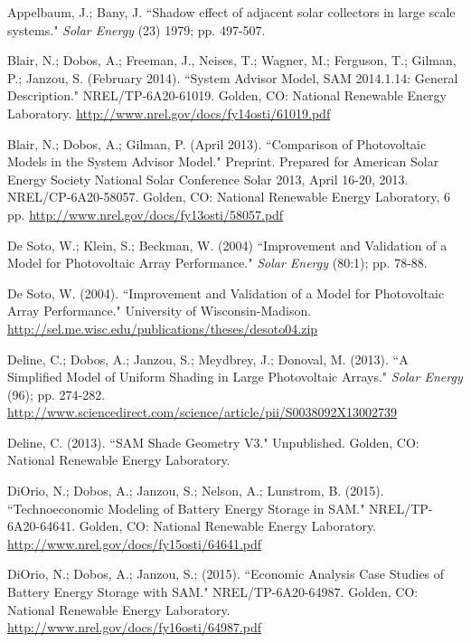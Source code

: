 \documentclass[12pt,letterpaper]{article}
\begin{document}
%
\begin{thebibliography}{99}

 Appelbaum, J.; Bany, J. ``Shadow effect of adjacent solar collectors in large scale systems." \textit{Solar Energy} (23) 1979; pp. 497-507.

 Blair, N.; Dobos, A.; Freeman, J., Neises, T.; Wagner, M.; Ferguson, T.; Gilman, P.; Janzou, S. (February 2014). ``System Advisor Model, SAM
2014.1.14: General Description." NREL/TP-6A20-61019. Golden, CO: National Renewable Energy Laboratory. \url{http://www.nrel.gov/docs/fy14osti/61019.pdf}

 Blair, N.; Dobos, A.; Gilman, P. (April 2013). ``Comparison of Photovoltaic Models in the System Advisor Model." Preprint. Prepared for American Solar Energy Society National Solar Conference Solar 2013, April 16-20, 2013. NREL/CP-6A20-58057. Golden, CO: National Renewable Energy Laboratory, 6 pp. \url{http://www.nrel.gov/docs/fy13osti/58057.pdf}

 De Soto, W.; Klein, S.; Beckman, W. (2004) ``Improvement and Validation of a Model for Photovoltaic Array Performance." \textit{Solar Energy} (80:1); pp. 78-88.

 De Soto, W. (2004). ``Improvement and Validation of a Model for Photovoltaic Array Performance." University of Wisconsin-Madison. \url{http://sel.me.wisc.edu/publications/theses/desoto04.zip}

 Deline, C.; Dobos, A.; Janzou, S.; Meydbrey, J.; Donoval, M. (2013). ``A Simplified Model of Uniform Shading in Large Photovoltaic Arrays." \textit{Solar Energy} (96); pp. 274-282. \url{http://www.sciencedirect.com/science/article/pii/S0038092X13002739}

 Deline, C. (2013). ``SAM Shade Geometry V3." Unpublished. Golden, CO: National Renewable Energy Laboratory.

 DiOrio, N.; Dobos, A.; Janzou, S.; Nelson, A.; Lunstrom, B. (2015). ``Technoeconomic Modeling of Battery Energy Storage in SAM."  NREL/TP-6A20-64641. Golden, CO: National Renewable Energy Laboratory. \url{http://www.nrel.gov/docs/fy15osti/64641.pdf}

 DiOrio, N.; Dobos, A.; Janzou, S.; (2015). ``Economic Analysis Case Studies of Battery Energy Storage with SAM."  NREL/TP-6A20-64987. Golden, CO: National Renewable Energy Laboratory. \url{http://www.nrel.gov/docs/fy16osti/64987.pdf}


\end{thebibliography}
\end{document}
